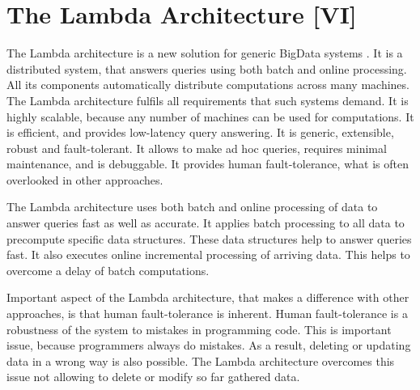 \chapter{The Lambda Architecture [VI]}
\label{chap:lambda_architecture}


The Lambda architecture is a new solution for generic BigData systems \cite{Marz2014}.
It is a distributed system, that answers queries using both batch and online processing.
All its components automatically distribute computations across many machines.
The Lambda architecture fulfils all requirements that such systems demand.
It is highly scalable, because any number of machines can be used for computations.
It is efficient, and provides low-latency query answering.
It is generic, extensible, robust and fault-tolerant.
It allows to make ad hoc queries, requires minimal maintenance, and is debuggable.
It provides human fault-tolerance, what is often overlooked in other approaches.

The Lambda architecture uses both batch and online processing of data to answer queries fast as well as accurate.
It applies batch processing to all data to precompute specific data structures.
These data structures help to answer queries fast.
It also executes online incremental processing of arriving data.
This helps to overcome a delay of batch computations.

Important aspect of the Lambda architecture, that makes a difference with other approaches, is that human fault-tolerance is inherent.
Human fault-tolerance is a robustness of the system to mistakes in programming code.
This is important issue, because programmers always do mistakes.
As a result, deleting or updating data in a wrong way is also possible.
The Lambda architecture overcomes this issue not allowing to delete or modify so far gathered data.




